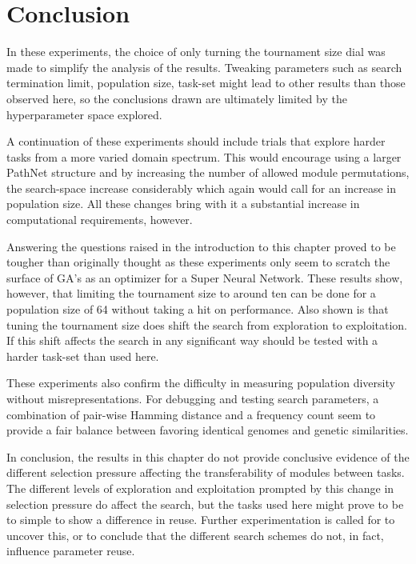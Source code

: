 \section{Conclusion}
In these experiments, the choice of only turning the tournament size dial was made to simplify the analysis of the results. Tweaking parameters such as search termination limit, population size, task-set might lead to other results than those observed here, so the conclusions drawn are  ultimately limited by the hyperparameter space explored. 

A continuation of these experiments should include trials that explore harder tasks from a more varied domain spectrum. This would encourage using a larger PathNet structure and by increasing the number of allowed module permutations, the search-space increase considerably which again would call for an increase in population size. All these changes bring with it a substantial increase in computational requirements, however.

Answering the questions raised in the introduction to this chapter proved to be tougher than originally thought as these experiments only seem to scratch the surface of GA's as an optimizer for a Super Neural Network. These results show, however, that limiting the tournament size to around ten can be done for a population size of 64 without taking a hit on performance. Also shown is that tuning the tournament size does shift the search from exploration to exploitation. If this shift affects the search in any significant way should be tested with a harder task-set than used here. 

These experiments also confirm the difficulty in measuring population diversity without misrepresentations. For debugging and testing search parameters, a combination of pair-wise Hamming distance and a frequency count seem to provide a fair balance between favoring identical genomes and genetic similarities.  

In conclusion, the results in this chapter do not provide conclusive evidence of the different selection pressure affecting the transferability of modules between tasks. The different levels of exploration and exploitation prompted by this change in selection pressure do affect the search, but the tasks used here might prove to be to simple to show a difference in reuse. Further experimentation is called for to uncover this, or to conclude that the different search schemes do not, in fact, influence parameter reuse.
